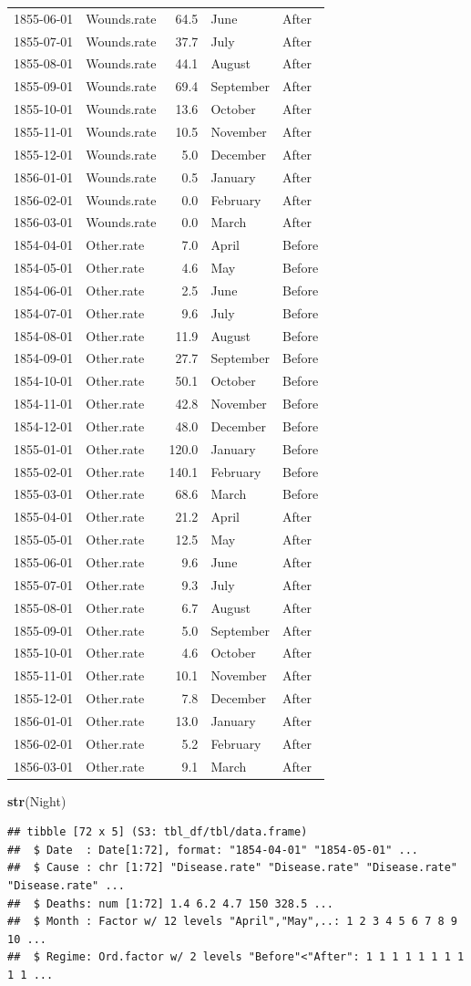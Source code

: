 \documentclass[
]{article}
\newenvironment{Shaded}{\begin{snugshade}}{\end{snugshade}}
\newcommand{\KeywordTok}[1]{\textcolor[rgb]{0.13,0.29,0.53}{\textbf{#1}}}
\newcommand{\NormalTok}[1]{#1}
\begin{document}
\begin{longtable}[]{@{}llrll@{}}
1855-06-01 & Wounds.rate & 64.5 & June & After\tabularnewline
1855-07-01 & Wounds.rate & 37.7 & July & After\tabularnewline
1855-08-01 & Wounds.rate & 44.1 & August & After\tabularnewline
1855-09-01 & Wounds.rate & 69.4 & September & After\tabularnewline
1855-10-01 & Wounds.rate & 13.6 & October & After\tabularnewline
1855-11-01 & Wounds.rate & 10.5 & November & After\tabularnewline
1855-12-01 & Wounds.rate & 5.0 & December & After\tabularnewline
1856-01-01 & Wounds.rate & 0.5 & January & After\tabularnewline
1856-02-01 & Wounds.rate & 0.0 & February & After\tabularnewline
1856-03-01 & Wounds.rate & 0.0 & March & After\tabularnewline
1854-04-01 & Other.rate & 7.0 & April & Before\tabularnewline
1854-05-01 & Other.rate & 4.6 & May & Before\tabularnewline
1854-06-01 & Other.rate & 2.5 & June & Before\tabularnewline
1854-07-01 & Other.rate & 9.6 & July & Before\tabularnewline
1854-08-01 & Other.rate & 11.9 & August & Before\tabularnewline
1854-09-01 & Other.rate & 27.7 & September & Before\tabularnewline
1854-10-01 & Other.rate & 50.1 & October & Before\tabularnewline
1854-11-01 & Other.rate & 42.8 & November & Before\tabularnewline
1854-12-01 & Other.rate & 48.0 & December & Before\tabularnewline
1855-01-01 & Other.rate & 120.0 & January & Before\tabularnewline
1855-02-01 & Other.rate & 140.1 & February & Before\tabularnewline
1855-03-01 & Other.rate & 68.6 & March & Before\tabularnewline
1855-04-01 & Other.rate & 21.2 & April & After\tabularnewline
1855-05-01 & Other.rate & 12.5 & May & After\tabularnewline
1855-06-01 & Other.rate & 9.6 & June & After\tabularnewline
1855-07-01 & Other.rate & 9.3 & July & After\tabularnewline
1855-08-01 & Other.rate & 6.7 & August & After\tabularnewline
1855-09-01 & Other.rate & 5.0 & September & After\tabularnewline
1855-10-01 & Other.rate & 4.6 & October & After\tabularnewline
1855-11-01 & Other.rate & 10.1 & November & After\tabularnewline
1855-12-01 & Other.rate & 7.8 & December & After\tabularnewline
1856-01-01 & Other.rate & 13.0 & January & After\tabularnewline
1856-02-01 & Other.rate & 5.2 & February & After\tabularnewline
1856-03-01 & Other.rate & 9.1 & March & After\tabularnewline
\bottomrule
\end{longtable}

\begin{Shaded}
\begin{Highlighting}[]
\KeywordTok{str}\NormalTok{(Night)}
\end{Highlighting}
\end{Shaded}

\begin{verbatim}
## tibble [72 x 5] (S3: tbl_df/tbl/data.frame)
##  $ Date  : Date[1:72], format: "1854-04-01" "1854-05-01" ...
##  $ Cause : chr [1:72] "Disease.rate" "Disease.rate" "Disease.rate" "Disease.rate" ...
##  $ Deaths: num [1:72] 1.4 6.2 4.7 150 328.5 ...
##  $ Month : Factor w/ 12 levels "April","May",..: 1 2 3 4 5 6 7 8 9 10 ...
##  $ Regime: Ord.factor w/ 2 levels "Before"<"After": 1 1 1 1 1 1 1 1 1 1 ...
\end{verbatim}
\end{document}

